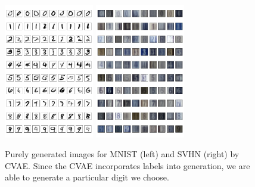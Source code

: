 \documentclass[10pt]{article}
\begin{document}
\begin{figure}[!ht]
\centering
\includegraphics[width=0.35\textwidth]{images/by_label.png}
\includegraphics[width=0.35\textwidth]{images/svhn_cvae_fc_label_gen.png}
\caption{Purely generated images for MNIST (left) and SVHN (right) by CVAE. Since the CVAE incorporates labels into generation, we are able to generate a particular digit we choose.}
\label{figure:cvae_label}
\end{figure}
\end{document}
